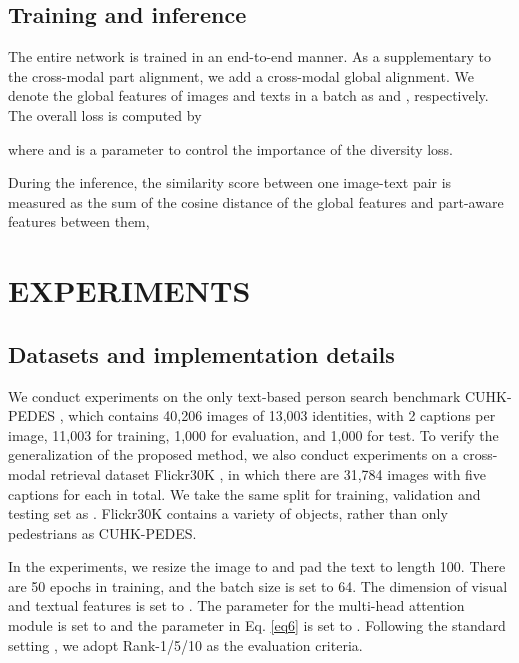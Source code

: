 \documentclass{article}
\begin{document}
\subsection{Training and inference}
The entire network is trained in an end-to-end manner. As a supplementary to the cross-modal part alignment, we add a cross-modal global alignment. We denote the global features of images and texts in a batch as  and , respectively. The overall loss is computed by

where  and 
 is a parameter to control the importance of the diversity loss.
\par
During the inference, the similarity score between one image-text pair is measured as the sum of the cosine distance of the global features and part-aware features between them,

\section{EXPERIMENTS}
\subsection{Datasets and implementation details}
We conduct experiments on the only text-based person search benchmark CUHK-PEDES \cite{li2017person}, which contains 40,206 images of 13,003 identities, with 2 captions per image, 11,003 for training, 1,000 for evaluation, and 1,000 for test. To verify the generalization of the proposed method, we also conduct experiments on a cross-modal retrieval dataset Flickr30K \cite{young2014image},  in which there are 31,784 images with five captions for each in total. We take the same split for training, validation and testing set as \cite{karpathy2015deep}. Flickr30K contains a variety of objects, rather than only pedestrians as CUHK-PEDES. \par
In the experiments, we resize the image to  and pad the text to length 100. There are 50 epochs in training, and the batch size is set to 64. The dimension of visual and textual features is set to . The parameter  for the multi-head attention module is set to  and the parameter  in Eq. \ref{eq6} is set to . Following the standard setting \cite{wang2020vitaa}, we adopt Rank-1/5/10 as the evaluation criteria.
\end{document}
